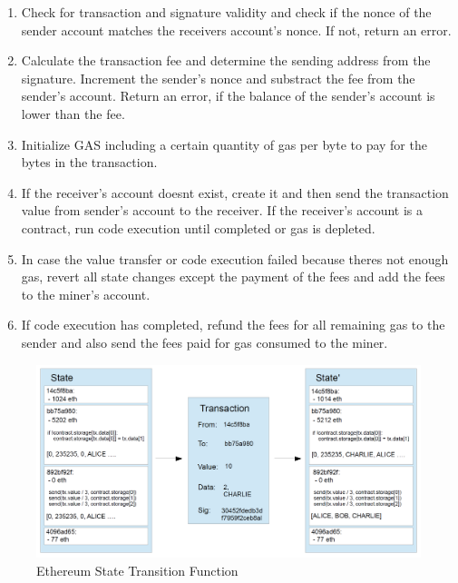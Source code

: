 \begin{enumerate}
	\item Check for transaction and signature validity and check if the nonce of the sender account matches the receivers account's nonce. If not, return an error.
	\item Calculate the transaction fee and determine the sending address from the signature. Increment the sender's nonce and substract the fee from the sender's account. Return an error, if the balance of the sender's account is lower than the fee.
	\item Initialize GAS including a certain quantity of gas per byte to pay for the bytes in the transaction.
	\item If the receiver's account doesnt exist, create it and then send the transaction value from sender's account to the receiver. If the receiver's account is a contract, run code execution until completed or gas is depleted.
	\item In case the value transfer or code execution failed because theres not enough gas, revert all state changes except the payment of the fees and add the fees to the miner's account.
	\item If code execution has completed, refund the fees for all remaining gas to the sender and also send the fees paid for gas consumed to the miner.
\end{enumerate}


\begin{figure}[h]
	\includegraphics[width=14cm]{ethereum_state_transition_function}	%
	\caption{Ethereum State Transition Function}
	\label{fig:ethereum_state_transition_function}
\end{figure}

